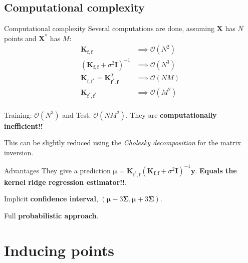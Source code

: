 \documentclass[10pt]{beamer}
\begin{document}
\subsection{Computational complexity}
\begin{frame}{Computational complexity}
    Several computations are done, assuming \( \bm X \) has \( N \) points and \( \bm X^* \) has \( M \):
    \[
         \begin{aligned}
             \bm K_{\bm f, \bm f} &\implies \mathcal{O}(N^2)\\
             \left(\bm K_{\bm f, \bm f} + \sigma^2 \bm I \right)^{-1} &\implies \mathcal{O}(N^3)\\
             \bm K_{\bm f, \bm f^*} = \bm K_{\bm f^*, \bm f}^T &\implies \mathcal{O}(NM)\\
             \bm K_{\bm f^*, \bm f^*} &\implies \mathcal{O}(M^2)\\
         \end{aligned}
    \] 

Training: \( \mathcal{O}(N^3) \) and Test: \( \mathcal{O}(NM^2) \). They are \textbf{computationally inefficient!!}  

This can be slightly reduced using the \emph{Cholesky decomposition} for the matrix inversion.
\end{frame}

\begin{frame}{Advantages}
    They give a prediction \( \bm \mu =\bm K_{\bm f^*, \bm f}(\bm K_{\bm f, \bm f} + \sigma^2\bm I)^{-1}\bm y\). \textbf{Equals the kernel ridge regression estimator!!}.   

    Implicit \textbf{confidence interval}, \( (\bm \mu - 3\bm \Sigma, \bm \mu + 3\bm \Sigma) \). 

    Full \textbf{probabilistic approach}.
\end{frame}

\section{Inducing points}
\end{document}
